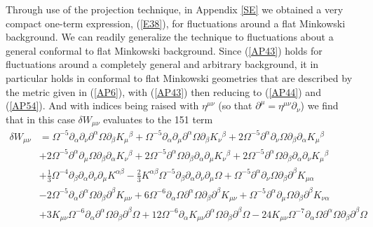 \documentclass[aps]{revtex4}
\begin{document}
Through use of the projection technique, in Appendix \ref{SE} we obtained a very compact one-term expression, (\ref{E38}),  for fluctuations around a flat Minkowski background. We can readily generalize the technique to fluctuations about a general conformal to flat Minkowski background. Since (\ref{AP43}) holds for fluctuations around a completely general and arbitrary background, it in particular holds in conformal to flat Minkowski geometries that are described by the metric given in (\ref{AP6}), with (\ref{AP43}) then reducing to (\ref{AP44}) and (\ref{AP54}). And with indices being raised with $\eta^{\mu\nu}$ (so that $\partial^{\mu}=\eta^{\mu\nu}\partial_{\nu}$) we find that in this case $\delta W_{\mu\nu}$ evaluates to the 151 term
%
\begin{align}
\delta W_{\mu\nu}&=\Omega^{-5} \partial_{\alpha}\partial_{\nu}\partial^{\alpha}\Omega \partial_{\beta}K_{\mu}{}^{\beta} + \Omega^{-5} \partial_{\alpha}\partial_{\mu}\partial^{\alpha}\Omega \partial_{\beta}K_{\nu}{}^{\beta} + 2 \Omega^{-5} \partial^{\alpha}\partial_{\nu}\Omega \partial_{\beta}\partial_{\alpha}K_{\mu}{}^{\beta}
\nonumber\\
& + 2 \Omega^{-5} \partial^{\alpha}\partial_{\mu}\Omega \partial_{\beta}\partial_{\alpha}K_{\nu}{}^{\beta} + 2 \Omega^{-5} \partial^{\alpha}\Omega \partial_{\beta}\partial_{\alpha}\partial_{\mu}K_{\nu}{}^{\beta} + 2 \Omega^{-5} \partial^{\alpha}\Omega \partial_{\beta}\partial_{\alpha}\partial_{\nu}K_{\mu}{}^{\beta} 
\nonumber\\
&+ \tfrac{1}{3} \Omega^{-4} \partial_{\beta}\partial_{\alpha}\partial_{\nu}\partial_{\mu}K^{\alpha \beta} -  \tfrac{2}{3} K^{\alpha \beta} \Omega^{-5} \partial_{\beta}\partial_{\alpha}\partial_{\nu}\partial_{\mu}\Omega + \Omega^{-5} \partial^{\alpha}\partial_{\nu}\Omega \partial_{\beta}\partial^{\beta}K_{\mu \alpha}
\nonumber\\
& - 2 \Omega^{-5} \partial_{\alpha}\partial^{\alpha}\Omega \partial_{\beta}\partial^{\beta}K_{\mu \nu} + 6 \Omega^{-6} \partial_{\alpha}\Omega \partial^{\alpha}\Omega \partial_{\beta}\partial^{\beta}K_{\mu \nu} + \Omega^{-5} \partial^{\alpha}\partial_{\mu}\Omega \partial_{\beta}\partial^{\beta}K_{\nu \alpha} 
\nonumber\\
&+ 3 K_{\mu \nu} \Omega^{-6} \partial_{\alpha}\partial^{\alpha}\Omega \partial_{\beta}\partial^{\beta}\Omega + 12 \Omega^{-6} \partial_{\alpha}K_{\mu \nu} \partial^{\alpha}\Omega \partial_{\beta}\partial^{\beta}\Omega - 24 K_{\mu \nu} \Omega^{-7} \partial_{\alpha}\Omega \partial^{\alpha}\Omega \partial_{\beta}\partial^{\beta}\Omega 

\end{align}
\end{document}
